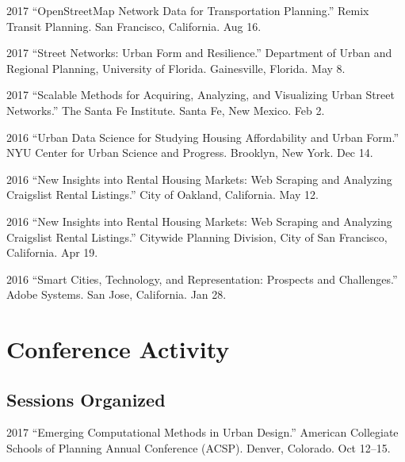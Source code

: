\documentclass{academiccv}
\begin{document}
\begin{tablist}
\item[2017] \tab \enquote{OpenStreetMap Network Data for Transportation Planning.} Remix Transit Planning. San Francisco, California. Aug 16.

\item[2017] \tab \enquote{Street Networks: Urban Form and Resilience.} Department of Urban and Regional Planning, University of Florida. Gainesville, Florida. May 8.

\item[2017] \tab \enquote{Scalable Methods for Acquiring, Analyzing, and Visualizing Urban Street Networks.} The Santa Fe Institute. Santa Fe, New Mexico. Feb 2.

\item[2016] \tab \enquote{Urban Data Science for Studying Housing Affordability and Urban Form.} NYU Center for Urban Science and Progress. Brooklyn, New York. Dec 14.

\item[2016] \tab \enquote{New Insights into Rental Housing Markets: Web Scraping and Analyzing Craigslist Rental Listings.} City of Oakland, California. May 12.

\item[2016] \tab \enquote{New Insights into Rental Housing Markets: Web Scraping and Analyzing Craigslist Rental Listings.} Citywide Planning Division, City of San Francisco, California. Apr 19.

\item[2016] \tab \enquote{Smart Cities, Technology, and Representation: Prospects and Challenges.} Adobe Systems. San Jose, California. Jan 28.

\end{tablist}



\section*{Conference Activity}

\subsection*{Sessions Organized}

\begin{tablist}
	
\item[2017] \tab \enquote{Emerging Computational Methods in Urban Design.} American Collegiate Schools of Planning Annual Conference (ACSP). Denver, Colorado. Oct 12--15.
	
\end{tablist}
\end{document}
